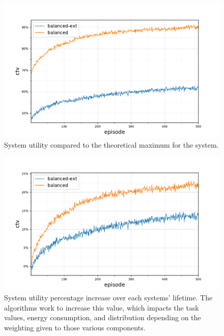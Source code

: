 
\begin{figure}[ht]
    \centering
    \includegraphics[width=0.7\linewidth]{5balanced_ctv-optimal-ctv}
    \captionsetup{labelfont=bf,singlelinecheck=on}
    \caption{System utility compared to the theoretical maximum for the \simulationSimple{}{} system.}
    \label{fig:5_ctvoptimalctv}
\end{figure}
\begin{figure}[ht]
	\centering
	\includegraphics[width=0.7\linewidth]{5balanced_ctv-optimal-ctv-gain}
	\captionsetup{labelfont=bf,singlelinecheck=on}
	\caption{System utility percentage increase over each systems' lifetime. The algorithms work to increase this value, which impacts the task values, energy consumption, and distribution depending on the weighting given to those various components.}
	\label{fig:5_ctv-optimal-ctv-gain}
\end{figure}

